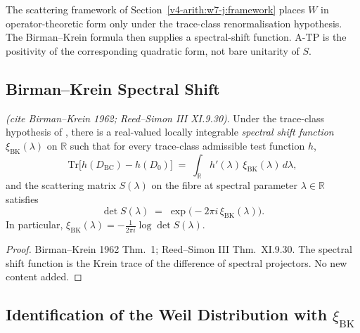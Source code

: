 The scattering framework of Section~\ref{v4-arith:w7-j:framework}
places \(W\) in operator-theoretic form only under the trace-class
renormalisation hypothesis. The Birman--Krein formula then supplies a
spectral-shift function. A-TP is the positivity of the corresponding
quadratic form, not bare unitarity of \(S\).

\subsection{Birman--Krein Spectral Shift}
\label{v4-arith:w7-j:reformulation:birman-krein}

\begin{proposition}
\label{v4-arith:w7-j:prop:birman-krein}
\ClaimStatusProvedElsewhere \emph{(cite Birman--Krein 1962; Reed--Simon III XI.9.30)}.
Under the trace-class hypothesis of
, there is a real-valued
locally integrable \emph{spectral shift function}
\(\xi_{\mathrm{BK}}(\lambda)\) on \(\mathbb{R}\) such that for every
trace-class admissible test function \(h\),
\begin{equation}
\label{v4-arith:w7-j:eq:birman-krein}
\mathrm{Tr}\bigl[h(D_{\mathrm{BC}})-h(D_{0})\bigr]\;=\;\int_{\mathbb{R}}h'(\lambda)\,\xi_{\mathrm{BK}}(\lambda)\,d\lambda,
\end{equation}
and the scattering matrix \(S(\lambda)\) on the fibre at spectral
parameter \(\lambda\in\mathbb{R}\) satisfies
\begin{equation}
\label{v4-arith:w7-j:eq:BK-det}
\det S(\lambda)\;=\;\exp\bigl(-2\pi i\,\xi_{\mathrm{BK}}(\lambda)\bigr).
\end{equation}
In particular, \(\xi_{\mathrm{BK}}(\lambda) = -\tfrac{1}{2\pi i}\log\det S(\lambda)\).
\end{proposition}

\begin{proof}
Birman--Krein 1962 Thm.~1; Reed--Simon III Thm.~XI.9.30. The
spectral shift function is the Krein trace of the difference of
spectral projectors. No new content added.
\end{proof}

\subsection{Identification of the Weil Distribution with \(\xi_{\mathrm{BK}}\)}
\label{v4-arith:w7-j:reformulation:identification}

